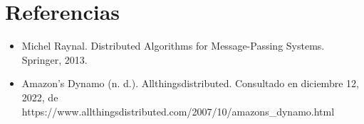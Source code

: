 \newpage\section*{Referencias}
\begin{itemize}
\item Michel Raynal. Distributed Algorithms for Message-Passing Systems. Springer, 2013.
\item Amazon's Dynamo (n. d.). Allthingsdistributed. Consultado en diciembre 12, 2022, de \\
https://www.allthingsdistributed.com/2007/10/amazons\_dynamo.html
\end{itemize}